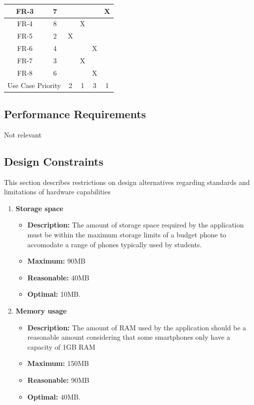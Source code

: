 \documentclass{article}
\begin{document}
\begin{enumerate}
\begin{table}[]
\begin{tabular}{cc|c|c|c|c|}
 \multicolumn{1}{|c|}{FR-3}        & 7        &        &       &       & X     \\ \hline
 \multicolumn{1}{|c|}{FR-4}        & 8        &        & X     &       &       \\ \hline
 \multicolumn{1}{|c|}{FR-5}        & 2        & X      &       &       &       \\ \hline
 \multicolumn{1}{|c|}{FR-6}        & 4        &        &       & X     &       \\ \hline
 \multicolumn{1}{|c|}{FR-7}        & 3        &        & X     &       &       \\ \hline
 \multicolumn{1}{|c|}{FR-8}        & 6        &        &       & X     &       \\ \hline
 \multicolumn{2}{|c|}{Use Case Priority}      & 2      & 1     & 3     & 1     \\ \hline
 \end{tabular}
 \end{table}
	\end{enumerate}
	
	
	\subsection{Performance Requirements}
	Not relevant
	
	\subsection{Design Constraints}
	This section describes restrictions on design alternatives regarding standards and limitations of hardware capabilities
	\begin{enumerate}
		\item \textbf{Storage space}
		\begin{itemize}
			\item \textbf{Description:} The amount of storage space required by the application must be within the maximum storage limits of a budget phone to accomodate a range of phones typically used by students.
			\item \textbf{Maximum:} 90MB
			\item \textbf{Reasonable:} 40MB
			\item \textbf{Optimal:} 10MB.\newline
		\end{itemize}
	
		\item \textbf{Memory usage}
		\begin{itemize}
			\item \textbf{Description:} The amount of RAM used by the application should be a reasonable amount considering that some smartphones only have a capacity of 1GB RAM
			\item \textbf{Maximum:} 150MB
			\item \textbf{Reasonable:} 90MB
			\item \textbf{Optimal:} 40MB.\newline
		\end{itemize}
	\end{enumerate}
	
\end{document}

